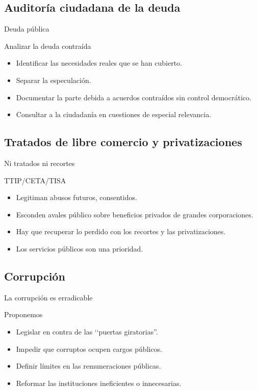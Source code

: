 \documentclass{beamer}
\begin{document}
\subsection{Auditor\'i{}a ciudadana de la deuda}

\begin{frame}{Deuda p\'ublica}
  \begin{block}{Analizar la deuda contra\'i{}da}
  \begin{itemize}
    \item Identificar las necesidades reales que se han cubierto.
    \item Separar la especulaci\'on.
    \item Documentar la parte debida a acuerdos contra\'i{}dos sin control democr\'atico.
    \item Consultar a la ciudadan\'ia en cuestiones de especial relevancia.
  \end{itemize}
  \end{block}
\end{frame}

\subsection{Tratados de libre comercio y privatizaciones}

\begin{frame}{Ni tratados ni recortes}
  \begin{block}{TTIP/CETA/TISA}
  \begin{itemize}
    \item Legitiman abusos futuros, consentidos.
    \item Esconden avales p\'ublico sobre beneficios privados de grandes corporaciones.
    \item Hay que recuperar lo perdido con los recortes y las privatizaciones.
    \item Los servicios p\'ublicos son una prioridad.
  \end{itemize}
  \end{block}
\end{frame}

\subsection{Corrupci\'on}

\begin{frame}{La corrupci\'on es erradicable}
  \begin{block}{Proponemos}
  \begin{itemize}
    \item Legislar en contra de las ‘‘puertas giratorias''.
    \item Impedir que corruptos ocupen cargos p\'ublicos.
    \item Definir l\'i{}mites en las remuneraciones p\'ublicas.
    \item Reformar las instituciones ineficientes o innecesarias.
  \end{itemize}
  \end{block}
\end{frame}
\end{document}

